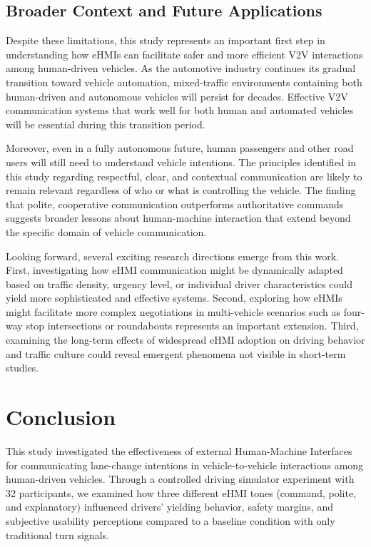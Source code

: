 \documentclass[manuscript,review]{acmart}
\begin{document}
\subsection{Broader Context and Future Applications}

Despite these limitations, this study represents an important first step in understanding how eHMIs can facilitate safer and more efficient V2V interactions among human-driven vehicles. As the automotive industry continues its gradual transition toward vehicle automation, mixed-traffic environments containing both human-driven and autonomous vehicles will persist for decades. Effective V2V communication systems that work well for both human and automated vehicles will be essential during this transition period.

Moreover, even in a fully autonomous future, human passengers and other road users will still need to understand vehicle intentions. The principles identified in this study regarding respectful, clear, and contextual communication are likely to remain relevant regardless of who or what is controlling the vehicle. The finding that polite, cooperative communication outperforms authoritative commands suggests broader lessons about human-machine interaction that extend beyond the specific domain of vehicle communication.

Looking forward, several exciting research directions emerge from this work. First, investigating how eHMI communication might be dynamically adapted based on traffic density, urgency level, or individual driver characteristics could yield more sophisticated and effective systems. Second, exploring how eHMIs might facilitate more complex negotiations in multi-vehicle scenarios such as four-way stop intersections or roundabouts represents an important extension. Third, examining the long-term effects of widespread eHMI adoption on driving behavior and traffic culture could reveal emergent phenomena not visible in short-term studies.

\section{Conclusion}

This study investigated the effectiveness of external Human-Machine Interfaces for communicating lane-change intentions in vehicle-to-vehicle interactions among human-driven vehicles. Through a controlled driving simulator experiment with 32 participants, we examined how three different eHMI tones (command, polite, and explanatory) influenced drivers' yielding behavior, safety margins, and subjective usability perceptions compared to a baseline condition with only traditional turn signals.
\end{document}
